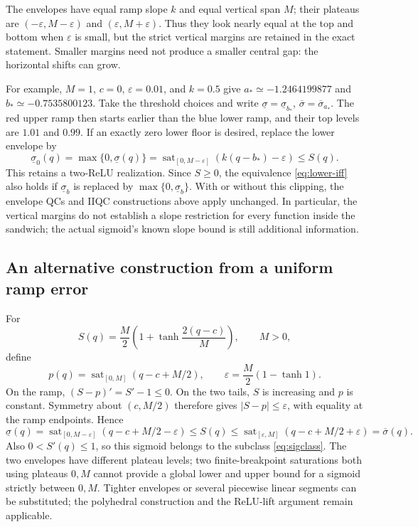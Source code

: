 \documentclass[10pt,a4paper]{article}
\theoremstyle{definition}
\theoremstyle{remark}
\newcommand{\sat}{\operatorname{sat}}
\begin{document}
The envelopes have equal ramp slope $k$ and equal vertical span $M$; their plateaus are $(-\varepsilon,M-\varepsilon)$ and $(\varepsilon,M+\varepsilon)$. Thus they look nearly equal at the top and bottom when $\varepsilon$ is small, but the strict vertical margins are retained in the exact statement. Smaller margins need not produce a smaller central gap: the horizontal shifts can grow.

For example, $M=1$, $c=0$, $\varepsilon=0.01$, and $k=0.5$ give $a_*\simeq-1.2464199877$ and $b_*\simeq-0.7535800123$. Take the threshold choices and write $\underline\sigma=\underline\sigma_{b_*}$, $\overline\sigma=\overline\sigma_{a_*}$. The red upper ramp then starts earlier than the blue lower ramp, and their top levels are $1.01$ and $0.99$. If an exactly zero lower floor is desired, replace the lower envelope by
\begin{equation}\label{eq:zero-floor}
 \underline\sigma_0(q)=\max\{0,\underline\sigma(q)\}
 =\sat_{[0,M-\varepsilon]}(k(q-b_*)-\varepsilon)\le S(q).
\end{equation}
This retains a two-ReLU realization. Since $S\ge0$, the equivalence \eqref{eq:lower-iff} also holds if $\underline\sigma_b$ is replaced by $\max\{0,\underline\sigma_b\}$. With or without this clipping, the envelope QCs and IIQC constructions above apply unchanged. In particular, the vertical margins do not establish a slope restriction for every function inside the sandwich; the actual sigmoid's known slope bound is still additional information.

\subsection{An alternative construction from a uniform ramp error}
For
\[
 S(q)=\frac{M}{2}\left(1+\tanh\frac{2(q-c)}{M}\right),\qquad M>0,
\]
define
\[
 p(q)=\sat_{[0,M]}(q-c+M/2),\qquad
 \varepsilon=\frac M2(1-\tanh1).
\]
On the ramp, $(S-p)'=S'-1\le0$. On the two tails, $S$ is increasing and $p$ is constant. Symmetry about $(c,M/2)$ therefore gives $|S-p|\le\varepsilon$, with equality at the ramp endpoints. Hence
\begin{equation}\label{eq:concrete}
 \underline\sigma(q)=\sat_{[0,M-\varepsilon]}(q-c+M/2-\varepsilon)
 \le S(q)\le
 \sat_{[\varepsilon,M]}(q-c+M/2+\varepsilon)=\overline\sigma(q).
\end{equation}
Also $0<S'(q)\le1$, so this sigmoid belongs to the subclass \eqref{eq:sigclass}. The two envelopes have different plateau levels; two finite-breakpoint saturations both using plateaus $0,M$ cannot provide a global lower and upper bound for a sigmoid strictly between $0,M$. Tighter envelopes or several piecewise linear segments can be substituted; the polyhedral construction and the ReLU-lift argument remain applicable.
\end{document}
